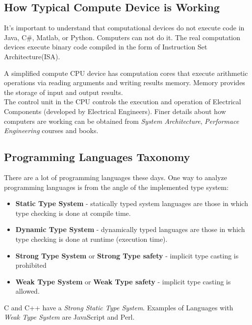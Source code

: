 \documentclass[
]{article}
\begin{document}
\hypertarget{how-typical-compute-device-is-working}{%
\subsection{How Typical Compute Device is
Working}\label{how-typical-compute-device-is-working}}

It's important to understand that computational devices do not execute
code in Java, C\#, Matlab, or Python. Computers can not do it. The real
computation devices execute binary code compiled in the form of
Instruction Set Architecture(ISA).

A simplified compute CPU device has computation cores that execute
arithmetic operations via reading arguments and writing results memory.
Memory provides the storage of input and output results.\\
The control unit in the CPU controls the execution and operation of
Electrical Components (developed by Electrical Engineers). Finer details
about how computers are working can be obtained from \emph{System
Architecture}, \emph{Performace Engineering} courses and books.

\hypertarget{programming-languages-taxonomy}{%
\subsection{Programming Languages
Taxonomy}\label{programming-languages-taxonomy}}

There are a lot of programming languages these days. One way to analyze
programming languages is from the angle of the implemented type system:

\begin{itemize}
\item
  \textbf{Static Type System} - statically typed system languages are
  those in which type checking is done at compile time.
\item
  \textbf{Dynamic Type System} - dynamically typed languages are those
  in which type checking is done at runtime (execution time).
\item
  \textbf{Strong Type System} or \textbf{Strong Type safety} - implicit
  type casting is prohibited
\item
  \textbf{Weak Type System} or \textbf{Weak Type safety} - implicit type
  casting is allowed.
\end{itemize}

C and C++ have a \emph{Strong Static Type System}. Examples of Languages
with \emph{Weak Type System} are JavaScript and Perl.
\end{document}
